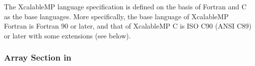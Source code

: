 The XcalableMP language specification is defined on the basis of Fortran
and C as the base languages. More specifically, the base language of
XcalableMP Fortran is Fortran 90 or later, and that of XcalableMP C is
ISO C90 (ANSI C89) or later with some extensions (see below).

\subsubsection{Array Section in {\XMPC}}











